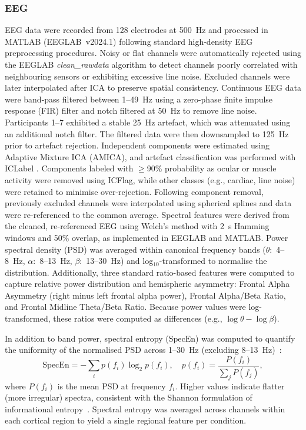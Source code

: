 \documentclass[lettersize,journal]{IEEEtran}
\begin{document}
\subsubsection{EEG}
EEG data were recorded from 128 electrodes at 500~Hz and processed in MATLAB (EEGLAB~v2024.1) following standard high-density EEG preprocessing procedures. Noisy or flat channels were automatically rejected using the EEGLAB \textit{clean\_rawdata} algorithm to detect channels poorly correlated with neighbouring sensors or exhibiting excessive line noise. Excluded channels were later interpolated after ICA to preserve spatial consistency. Continuous EEG data were band-pass filtered between 1--49~Hz using a zero-phase finite impulse response (FIR) filter and notch filtered at 50~Hz to remove line noise. Participants 1--7 exhibited a stable 25~Hz artefact, which was attenuated using an additional notch filter. The filtered data were then downsampled to 125~Hz prior to artefact rejection. Independent components were estimated using Adaptive Mixture ICA (AMICA), and artefact classification was performed with ICLabel \cite{pion-tonachiniICLabelAutomatedElectroencephalographic2019}. Components labeled with $\geq$90\% probability as ocular or muscle activity were removed using ICFlag, while other classes (e.g., cardiac, line noise) were retained to minimise over-rejection. Following component removal, previously excluded channels were interpolated using spherical splines and data were re-referenced to the common average. Spectral features were derived from the cleaned, re-referenced EEG using Welch’s method with 2~s Hamming windows and 50\% overlap, as implemented in EEGLAB and MATLAB. Power spectral density (PSD) was averaged within canonical frequency bands ($\theta$:~4--8~Hz, $\alpha$:~8--13~Hz, $\beta$:~13--30~Hz) and log$_{10}$-transformed to normalise the distribution. Additionally, three standard ratio-based features were computed to capture relative power distribution and hemispheric asymmetry: Frontal Alpha Asymmetry (right minus left frontal alpha power), Frontal Alpha/Beta Ratio, and Frontal Midline Theta/Beta Ratio. Because power values were log-transformed, these ratios were computed as differences (e.g., $\log \theta - \log \beta$). 

In addition to band power, spectral entropy (\( \mathrm{SpecEn} \)) was computed to quantify the uniformity of the normalised PSD across 1--30~Hz (excluding 8--13~Hz)~\cite{inouyeQuantificationEEGIrregularity1991}:
\begin{equation}
\mathrm{SpecEn} = -\sum_i p(f_i)\log_2 p(f_i), \quad 
p(f_i)=\frac{P(f_i)}{\sum_j P(f_j)} ,
\end{equation}
where \(P(f_i)\) is the mean PSD at frequency \(f_i\). Higher values indicate flatter (more irregular) spectra, consistent with the Shannon formulation of informational entropy~\cite{shannonMathematicalTheoryCommunication}. Spectral entropy was averaged across channels within each cortical region to yield a single regional feature per condition.
\end{document}
